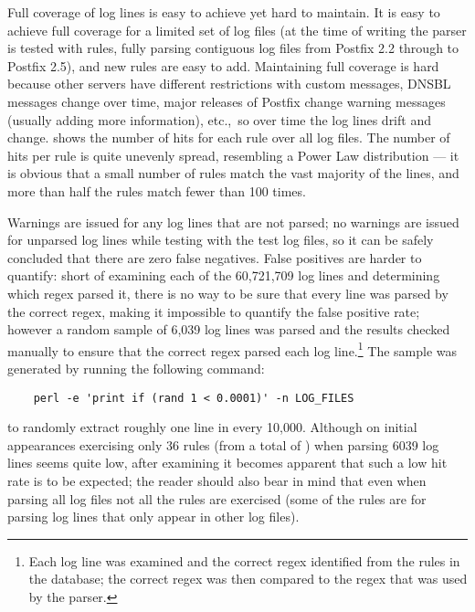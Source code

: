 Full coverage of log lines is easy to achieve yet hard to maintain.  It is
easy to achieve full coverage for a limited set of log files (at the time
of writing the parser is tested with \numberOFrules{} rules, fully parsing
\numberOFlogFILESall{} contiguous log files from Postfix 2.2 through to
Postfix 2.5), and new rules are easy to add.  Maintaining full coverage is
hard because other servers have different restrictions with custom
messages, \gls{DNSBL} messages change over time, major releases of Postfix
change warning messages (usually adding more information), etc.,\ so over
time the log lines drift and change.   shows the
number of hits for each rule over all \numberOFlogFILES{} log files.  The
number of hits per rule is quite unevenly spread, resembling a Power Law
distribution --- it is obvious that a small number of rules match the vast
majority of the lines, and more than half the rules match fewer than 100
times.


Warnings are issued for any log lines that are not parsed; no warnings are
issued for unparsed log lines while testing with the \numberOFlogFILES{}
test log files, so it can be safely concluded that there are zero false
negatives.  False positives are harder to quantify: short of examining each
of the 60,721,709 log lines and determining which regex parsed it, there
is no way to be sure that every line was parsed by the correct regex,
making it impossible to quantify the false positive rate; however a random
sample of 6,039 log lines was parsed and the results checked manually to
ensure that the correct regex parsed each log line.\footnote{Each log
line was examined and the correct regex identified from the
\numberOFrules{} rules in the database; the correct regex was then
compared to the regex that was used by the parser.}  The sample was
generated by running the following command:

\verb!    perl -e 'print if (rand 1 < 0.0001)' -n LOG_FILES!

\noindent{}to randomly extract roughly one line in every 10,000.  Although
on initial appearances exercising only 36 rules (from a total of
\numberOFrules{}) when parsing 6039 log lines seems quite low, after
examining  it becomes apparent that such
a low hit rate is to be expected; the reader should also bear in mind that
even when parsing all \numberOFlogFILES{} log files not all the rules are
exercised (some of the rules are for parsing log lines that only appear in
other log files).

